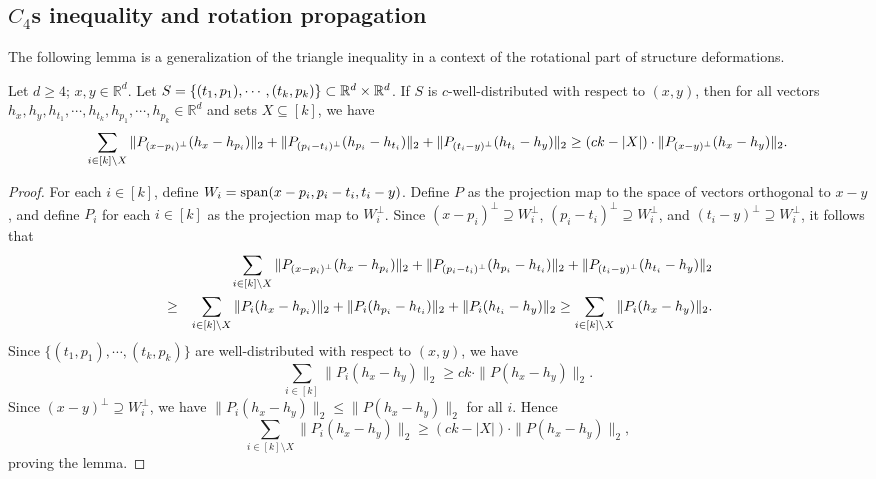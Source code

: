 \subsection{$C_4$s inequality and rotation propagation} \label{sec-c4-inequality}

The following lemma is a generalization of the triangle inequality in a context of the rotational part of structure deformations.

\begin{lemma}[$C_4$s Inequality] \label{lem:c4s}
Let $d\ge4$; $x,y \in \mathbb{R}^{d}$.  Let $S=\{(t_1, p_1), \cdots, (t_k, p_k)\} \subset \mathbb{R}^d \times \mathbb{R}^d$.  If $S$  is $c$-well-distributed
with respect to $(x,y)$, then for all vectors $h_{x},h_{y},h_{t_1},\cdots,h_{t_k},h_{p_1},\cdots,h_{p_k}\in\mathbb{R}^{d}$
and sets $X\subseteq[k]$, we have
\[
\sum_{i\in[k]\setminus X}\|P_{(x-p_{i})^{\perp}}(h_{x}-h_{p_i})\|_2 + 
\|P_{(p_{i}-t_i)^{\perp}}(h_{p_i}-h_{t_i})\|_2 + \|P_{(t_{i}-y)^{\perp}}(h_{t_i}-h_{y})\|_2 \ge(ck-|X|)\cdot\|P_{(x-y)^{\perp}}(h_{x}-h_{y})\|_2.
\]
\end{lemma}
\begin{proof}
For each $i\in[k]$, define $W_i = \operatorname{span}(x - p_i, p_i - t_i, t_i - y)$.
Define $P$ as the projection map to the space of vectors orthogonal
to $x-y$, and define $P_{i}$ for each $i\in[k]$  as the projection
map to $W_{i}^{\perp}$. Since $(x-p_{i})^{\perp}\supseteq W_{i}^{\perp}$, $(p_i - t_i)^{\perp}\supseteq W_{i}^{\perp}$, and $(t_i - y)^{\perp}\supseteq W_{i}^{\perp}$,
it follows that 
\begin{eqnarray*}
 &  &\sum_{i\in[k]\setminus X}\|P_{(x-p_{i})^{\perp}}(h_{x}-h_{p_i})\|_2 + 
\|P_{(p_{i}-t_i)^{\perp}}(h_{p_i}-h_{t_i})\|_2 + \|P_{(t_{i}-y)^{\perp}}(h_{t_i}-h_{y})\|_2 \\
 & \ge & \sum_{i\in[k]\setminus X}\|P_{i}(h_{x}-h_{p_i})\|_2 +\|P_{i}(h_{p_i}-h_{t_i})\|_2 +\|P_{i}(h_{t_i}-h_{y})\|_2 \ge\sum_{i\in[k]\setminus X}\|P_{i}(h_{x}-h_{y})\|_2.
\end{eqnarray*}
Since $\{(t_1, p_1), \cdots, (t_k, p_k)\}$ are well-distributed with respect to $(x,y)$,
we have
\begin{equation}
\sum_{i\in[k]}\|P_{i}(h_{x}-h_{y})\|_2 \ge ck\cdot\|P(h_{x}-h_{y})\|_2.\label{eq:proj_triangles}
\end{equation}
Since $(x-y)^\perp \supseteq W_i^\perp$, we have $\|P_{i}(h_{x}-h_{y})\|_2\le\|P(h_{x}-h_{y})\|_2$ for all $i$. Hence
\[
\sum_{i\in[k]\setminus X}\|P_{i}(h_{x}-h_{y})\|_2 \ge(ck-|X|)\cdot\|P(h_{x}-h_{y})\|_2,
\]
proving the lemma.
\end{proof}

